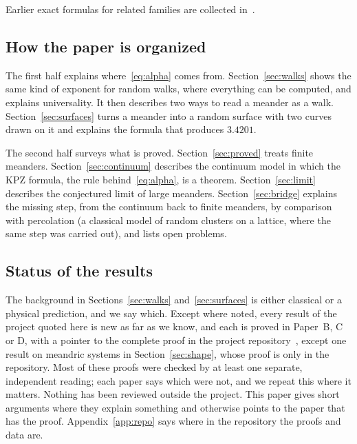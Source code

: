 Earlier exact formulas for related families are collected in~\cite{ExactPaper}.

\subsection{How the paper is organized}

The first half explains where~\eqref{eq:alpha} comes from. Section~\ref{sec:walks} shows the same
kind of exponent for random walks, where everything can be computed, and explains universality.
It then describes two ways to read a meander as a walk. Section~\ref{sec:surfaces} turns a
meander into a random surface with two curves drawn on it and explains the formula that produces
$3.4201$.

The second half surveys what is proved. Section~\ref{sec:proved} treats finite meanders.
Section~\ref{sec:continuum} describes the continuum model in which the KPZ formula, the rule
behind~\eqref{eq:alpha}, is a theorem.
Section~\ref{sec:limit} describes the conjectured limit of large meanders.
Section~\ref{sec:bridge} explains the missing step, from the continuum back to finite meanders,
by comparison with percolation (a classical model of random clusters on a lattice, where the
same step was carried out), and lists open problems.

\subsection{Status of the results}

The background in Sections~\ref{sec:walks} and~\ref{sec:surfaces} is either classical or a
physical prediction, and we say which. Except where noted, every result of the project quoted here
is new as far as we know, and each is proved in Paper~B, C or D, with a pointer to the complete proof in the project repository~\cite{Repo},
except one result on meandric systems in Section~\ref{sec:shape}, whose proof is only in the
repository. Most of these proofs were checked by at least one separate, independent reading; each
paper says which were not, and we repeat this where it matters. Nothing has been reviewed
outside the project. This paper gives short arguments where they explain something and
otherwise points to the paper that has the proof. Appendix~\ref{app:repo} says where in the
repository the proofs and data are.
